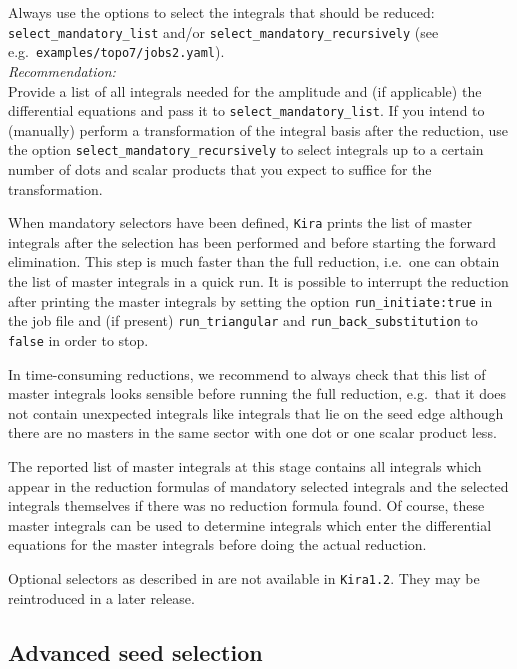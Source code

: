 \documentclass[a4paper,12pt]{article}
\newcommand*{\kira}{\texttt{Kira}}
\begin{document}
Always use the options to select the integrals that should be reduced:\\
\texttt{select\_mandatory\_list} and/or \texttt{select\_mandatory\_recursively}
(see e.g.\ \texttt{examples/topo7/jobs2.yaml}).
\medskip\\

\noindent
\textit{Recommendation:}
\smallskip\\
Provide a list of all integrals needed for the amplitude and (if applicable) the
differential equations and pass it to \texttt{select\_mandatory\_list}.
If you intend to (manually) perform a transformation of the integral basis after
the reduction, use the option \texttt{select\_mandatory\_recursively} to select
integrals up to a certain number of dots and scalar products that you expect to
suffice for the transformation.

\medskip
When mandatory selectors have been defined, \kira{} prints the list of master
integrals after the selection has been performed and before starting the forward
elimination.
This step is much faster than the full reduction, i.e.\ one can obtain the list
of master integrals in a quick run.
It is possible to interrupt the reduction after printing the master integrals
by setting the option \texttt{run\_initiate:\;true} in the job file
and (if present) \texttt{run\_triangular} and \texttt{run\_back\_substitution}
to \texttt{false} in order to stop.

In time-consuming reductions, we recommend to always check that this list of
master integrals looks sensible before running the full reduction, e.g.\ that it
does not contain unexpected integrals like integrals that lie on the seed edge
although there are no masters in the same sector with one dot or one scalar
product less.

The reported list of master integrals at this stage contains all integrals which
appear in the reduction formulas of mandatory selected integrals and the
selected integrals themselves if there was no reduction formula found.
Of course, these master integrals can be used to determine integrals which enter
the differential equations for the master integrals before doing the actual
reduction.

Optional selectors as described in \cite{Maierhoefer:2017hyi} are not available
in \kira{}\;\texttt{1.2}.
They may be reintroduced in a later release.


\subsection{Advanced seed selection}
\end{document}
